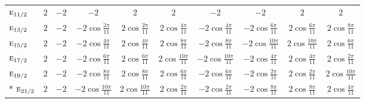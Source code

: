 \documentclass[10pt,a4paper]{article}
\numberwithin{equation}{section}
\newcommand{\irr}[1]{\text{\normalfont\scshape #1}}
\begin{document}
{{\begin{longtable}{@{}lccccccccc@{}}
$\irr{e}_{11/2}$ & $2$ & $-2$ & $-2$ & $2$ & $2$ & $-2$ & $-2$ & $2$ & $2$\\
$\irr{e}_{13/2}$ & $2$ & $-2$ & $-2\cos\tfrac{2\pi}{11}$ & $2\cos\tfrac{2\pi}{11}$ & $2\cos\tfrac{4\pi}{11}$ & $-2\cos\tfrac{4\pi}{11}$ & $-2\cos\tfrac{6\pi}{11}$ & $2\cos\tfrac{6\pi}{11}$ & $2\cos\tfrac{8\pi}{11}$\\
$\irr{e}_{15/2}$ & $2$ & $-2$ & $-2\cos\tfrac{4\pi}{11}$ & $2\cos\tfrac{4\pi}{11}$ & $2\cos\tfrac{8\pi}{11}$ & $-2\cos\tfrac{8\pi}{11}$ & $-2\cos\tfrac{10\pi}{11}$ & $2\cos\tfrac{10\pi}{11}$ & $2\cos\tfrac{6\pi}{11}$\\
$\irr{e}_{17/2}$ & $2$ & $-2$ & $-2\cos\tfrac{6\pi}{11}$ & $2\cos\tfrac{6\pi}{11}$ & $2\cos\tfrac{10\pi}{11}$ & $-2\cos\tfrac{10\pi}{11}$ & $-2\cos\tfrac{4\pi}{11}$ & $2\cos\tfrac{4\pi}{11}$ & $2\cos\tfrac{2\pi}{11}$\\
$\irr{e}_{19/2}$ & $2$ & $-2$ & $-2\cos\tfrac{8\pi}{11}$ & $2\cos\tfrac{8\pi}{11}$ & $2\cos\tfrac{6\pi}{11}$ & $-2\cos\tfrac{6\pi}{11}$ & $-2\cos\tfrac{2\pi}{11}$ & $2\cos\tfrac{2\pi}{11}$ & $2\cos\tfrac{10\pi}{11}$\\*
$\irr{e}_{21/2}$ & $2$ & $-2$ & $-2\cos\tfrac{10\pi}{11}$ & $2\cos\tfrac{10\pi}{11}$ & $2\cos\tfrac{2\pi}{11}$ & $-2\cos\tfrac{2\pi}{11}$ & $-2\cos\tfrac{8\pi}{11}$ & $2\cos\tfrac{8\pi}{11}$ & $2\cos\tfrac{4\pi}{11}$\\
\bottomrule\end{longtable}}}
\end{document}
